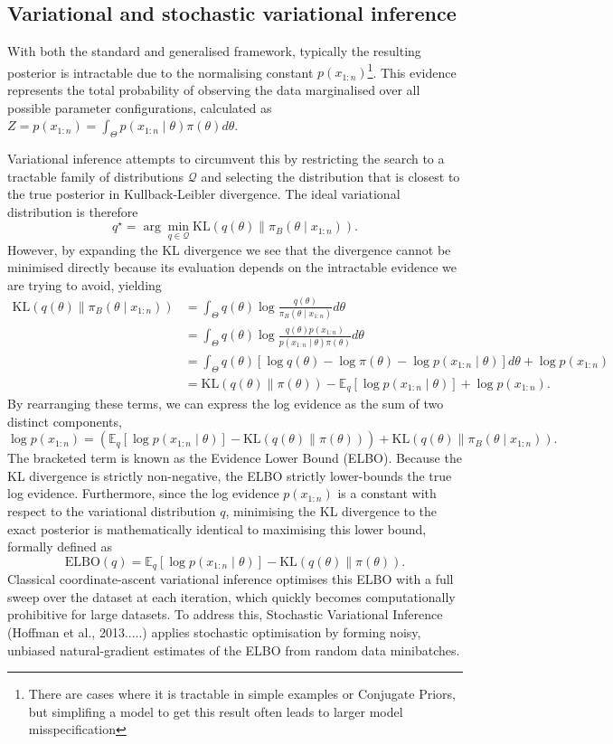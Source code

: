 \documentclass[11pt,a4paper]{article}
\newcommand{\add}[1]{{\color{red}#1}}
\begin{document}
\subsection*{Variational and stochastic variational inference}
With both the standard and generalised framework, typically the resulting posterior is intractable due to the normalising constant $p(x_{1:n})$\footnote{There are cases where it is tractable in simple examples or Conjugate Priors, but simplifing a model to get this result often leads to larger model misspecification}. This evidence represents the total probability of observing the data marginalised over all possible parameter configurations, calculated as $Z = p(x_{1:n}) = \int_{\Theta} p(x_{1:n} \mid \theta)\pi(\theta)d\theta$.

Variational inference attempts to circumvent this by restricting the search to a tractable family of distributions $\mathcal{Q}$ and selecting the distribution that is closest to the true posterior in Kullback-Leibler divergence. The ideal variational distribution is therefore$$q^\star = \arg\min_{q \in \mathcal{Q}} \mathrm{KL}(q(\theta) \| \pi_B(\theta \mid x_{1:n})).$$
However, by expanding the KL divergence we see that the divergence cannot be minimised directly because its evaluation depends on the intractable evidence we are trying to avoid, yielding$$\begin{aligned} \mathrm{KL}(q(\theta) \| \pi_B(\theta \mid x_{1:n})) &= \int_{\Theta} q(\theta) \log \frac{q(\theta)}{\pi_B(\theta \mid x_{1:n})} d\theta \\ &= \int_{\Theta} q(\theta) \log \frac{q(\theta) p(x_{1:n})}{p(x_{1:n} \mid \theta)\pi(\theta)} d\theta \\ &= \int_{\Theta} q(\theta) \left[ \log q(\theta) - \log \pi(\theta) - \log p(x_{1:n} \mid \theta) \right] d\theta + \log p(x_{1:n}) \\ &= \mathrm{KL}(q(\theta) \| \pi(\theta)) - \mathbb{E}_q[\log p(x_{1:n} \mid \theta)] + \log p(x_{1:n}). \end{aligned}$$By rearranging these terms, we can express the log evidence as the sum of two distinct components,$$\log p(x_{1:n}) = \left( \mathbb{E}_q[\log p(x_{1:n} \mid \theta)] - \mathrm{KL}(q(\theta) \| \pi(\theta)) \right) + \mathrm{KL}(q(\theta) \| \pi_B(\theta \mid x_{1:n})).$$The bracketed term is known as the Evidence Lower Bound (ELBO). Because the KL divergence is strictly non-negative, the ELBO strictly lower-bounds the true log evidence. Furthermore, since the log evidence $p(x_{1:n})$ is a constant with respect to the variational distribution $q$, minimising the KL divergence to the exact posterior is mathematically identical to maximising this lower bound, formally defined as$$\mathrm{ELBO}(q) = \mathbb{E}_q[\log p(x_{1:n} \mid \theta)] - \mathrm{KL}(q(\theta) \| \pi(\theta)).$$Classical coordinate-ascent variational inference optimises this ELBO with a full sweep over the dataset at each iteration\add{, which quickly becomes computationally prohibitive for large datasets.} To address this, Stochastic Variational Inference \add{(Hoffman et al., 2013.....)} applies stochastic optimisation by forming noisy, unbiased natural-gradient estimates of the ELBO from random data minibatches.
\end{document}
